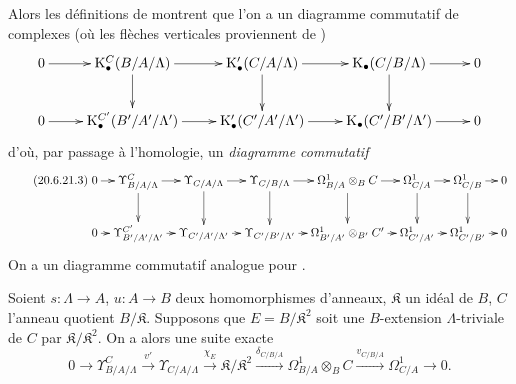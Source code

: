 \begin{remarks}[20.6.21]
\begin{enumerate}
Alors les définitions de  montrent que l'on a un
diagramme commutatif de complexes (où les flèches verticales proviennent de
)
\[
\xymatrix{
  0 \ar[r] & \mathrm{K}^C_\bullet(B/A/\Lambda) \ar[r] \ar[d] &
  \mathrm{K}'_\bullet(C/A/\Lambda) \ar[r] \ar[d] &
  \mathrm{K}_\bullet(C/B/\Lambda) \ar[r] \ar[d] & 0 \\
  0 \ar[r] & \mathrm{K}^{C'}_\bullet(B'/A'/\Lambda') \ar[r] &
  \mathrm{K}'_\bullet(C'/A'/\Lambda') \ar[r] &
  \mathrm{K}_\bullet(C'/B'/\Lambda') \ar[r] & 0
}
\]
d'où, par passage à l'homologie, un \emph{diagramme commutatif}
\begin{equation}
\tag{20.6.21.3}
\label{0.20.6.21.3-fr}
\xymatrix@C=0.7em{
  0 \ar[r] & \Upsilon^C_{B/A/\Lambda} \ar[r] \ar[d] &
  \Upsilon_{C/A/\Lambda} \ar[r] \ar[d] &
  \Upsilon_{C/B/\Lambda} \ar[r] \ar[d] &
  \Omega^1_{B/A}\otimes_B C \ar[r] \ar[d] &
  \Omega^1_{C/A} \ar[r] \ar[d] &
  \Omega^1_{C/B} \ar[r] \ar[d] & 0 \\
  0 \ar[r] & \Upsilon^{C'}_{B'/A'/\Lambda'} \ar[r] &
  \Upsilon_{C'/A'/\Lambda'} \ar[r] &
  \Upsilon_{C'/B'/\Lambda'} \ar[r] &
  \Omega^1_{B'/A'}\otimes_{B'} C' \ar[r] &
  \Omega^1_{C'/A'} \ar[r] & \Omega^1_{C'/B'} \ar[r] & 0
}
\end{equation}
On a un diagramme commutatif analogue pour .
\end{enumerate}
\end{remarks}

\begin{proposition}[20.6.22]
\label{0.20.6.22-fr}
Soient $s:\Lambda\to A$, $u:A\to B$ deux homomorphismes d'anneaux,
$\mathfrak{K}$ un idéal de $B$, $C$ l'anneau quotient $B/\mathfrak{K}$.
Supposons que $E=B/\mathfrak{K}^2$ soit une $B$-extension
$\Lambda$-triviale de $C$ par $\mathfrak{K}/\mathfrak{K}^2$. On a alors une
suite exacte
\begin{equation}
\tag{20.6.22.1}
\label{0.20.6.22.1-fr}
  0\to\Upsilon^C_{B/A/\Lambda}\xrightarrow{v'}
  \Upsilon_{C/A/\Lambda}\xrightarrow{\chi_E}
  \mathfrak{K}/\mathfrak{K}^2\xrightarrow{\delta_{C/B/A}}
  \Omega^1_{B/A}\otimes_B C\xrightarrow{v_{C/B/A}}
  \Omega^1_{C/A}\to0.
\end{equation}
\end{proposition}

